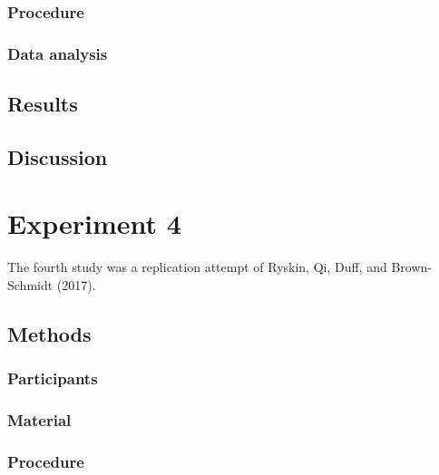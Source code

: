 \documentclass[
  english,
  man]{apa6}
\begin{document}
\hypertarget{procedure-2}{%
\subsubsection{Procedure}\label{procedure-2}}

\hypertarget{data-analysis-1}{%
\subsubsection{Data analysis}\label{data-analysis-1}}

\hypertarget{results-2}{%
\subsection{Results}\label{results-2}}

\hypertarget{discussion-2}{%
\subsection{Discussion}\label{discussion-2}}

\hypertarget{experiment-4}{%
\section{Experiment 4}\label{experiment-4}}

The fourth study was a replication attempt of Ryskin, Qi, Duff, and Brown-Schmidt (2017).

\hypertarget{methods-3}{%
\subsection{Methods}\label{methods-3}}

\hypertarget{participants-3}{%
\subsubsection{Participants}\label{participants-3}}

\hypertarget{material-2}{%
\subsubsection{Material}\label{material-2}}

\hypertarget{procedure-3}{%
\subsubsection{Procedure}\label{procedure-3}}
\end{document}
